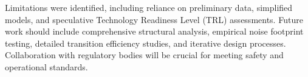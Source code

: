 Limitations were identified, including reliance on preliminary data, simplified models, and speculative Technology Readiness Level (TRL) assessments. Future work should include comprehensive structural analysis, empirical noise footprint testing, detailed transition efficiency studies, and iterative design processes. Collaboration with regulatory bodies will be crucial for meeting safety and operational standards.

